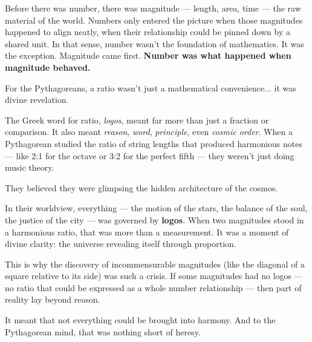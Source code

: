 Before there was number, there was magnitude — length, area, time — the raw material of the world. Numbers only entered the picture when those magnitudes happened to align neatly, when their relationship could be pinned down by a shared unit. In that sense, number wasn’t the foundation of mathematics. It was the exception.
Magnitude came first. \textbf{Number was what happened when magnitude behaved.}

\medskip

\begin{tcolorbox}[title=Historical Sidebar: Ratio as Revelation, colback=gray!5, colframe=black, fonttitle=\bfseries]

  For the Pythagoreans, a ratio wasn't just a mathematical convenience... it was divine revelation.

  \medskip
  
  The Greek word for ratio, \textit{logos}, meant far more than just a fraction or comparison. It also meant \textit{reason}, \textit{word}, \textit{principle}, even \textit{cosmic order}. When a Pythagorean studied the ratio of string lengths that produced harmonious notes — like 2:1 for the octave or 3:2 for the perfect fifth — they weren't just doing music theory.

  \medskip
  
  They believed they were glimpsing the hidden architecture of the cosmos.
  
  \medskip
  
  In their worldview, everything — the motion of the stars, the balance of the soul, the justice of the city — was governed by \textbf{logos}. When two magnitudes stood in a harmonious ratio, that was more than a measurement. It was a moment of divine clarity: the universe revealing itself through proportion.
  
  \medskip
  
  This is why the discovery of incommensurable magnitudes (like the diagonal of a square relative to its side) was such a crisis. If some magnitudes had no logos — no ratio that could be expressed as a whole number relationship — then part of reality lay beyond reason.
  
  \medskip

  It meant that not everything could be brought into harmony.  And to the Pythagorean mind, that was nothing short of heresy.
  
\end{tcolorbox}
